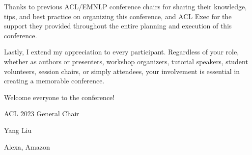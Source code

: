 Thanks to previous ACL/EMNLP conference chairs for sharing their knowledge, tips, and best practice on organizing this conference, and ACL Exec for the support they provided throughout the entire planning and execution of this conference. 

Lastly, I extend my appreciation to every participant. Regardless of your role, whether as authors or presenters, workshop organizers, tutorial speakers, student volunteers, session chairs, or simply attendees, your involvement is essential in creating a memorable conference. 

Welcome everyone to the conference!

\vspace{2ex}

ACL 2023 General Chair

Yang Liu

Alexa, Amazon

\clearpage